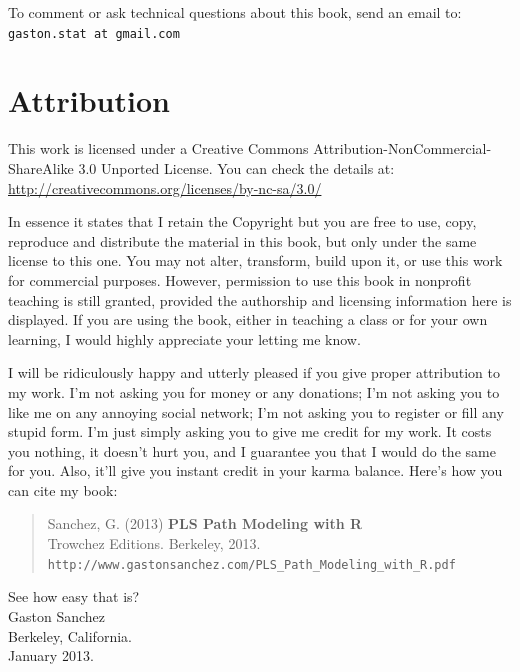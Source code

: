 \documentclass[12pt]{book}\usepackage{graphicx, color}
\begin{document}
To comment or ask technical questions about this book, send an email to: \\
\texttt{gaston.stat at gmail.com}


\section*{Attribution}
This work is licensed under a Creative Commons Attribution-NonCommercial-ShareAlike 3.0 Unported License. You can check the details at: \\
\href{http://creativecommons.org/licenses/by-nc-sa/3.0/}{http://creativecommons.org/licenses/by-nc-sa/3.0/}

In essence it states that I retain the Copyright but you are free to use, copy, reproduce and distribute the material in this book, but only under the same license to this one. You may not alter, transform, build upon it, or use this work for commercial purposes. However, permission to use this book in nonprofit teaching is still granted, provided the authorship and licensing information here is displayed. If you are using the book, either in teaching a class or for your own learning, I would highly appreciate your letting me know.

I will be ridiculously happy and utterly pleased if you give proper attribution to my work. I'm not asking you for money or any donations; I'm not asking you to like me on any annoying social network; I'm not asking you to register or fill any stupid form. I'm just simply asking you to give me credit for my work. It costs you nothing, it doesn't hurt you, and I guarantee you that I would do the same for you. Also, it'll give you instant credit in your karma balance. Here's how you can cite my book:
\vspace{2mm}
\begin{quotation}\noindent
\textsf{Sanchez, G. (2013) \textbf{PLS Path Modeling with R} \\
Trowchez Editions. Berkeley, 2013.} \\
\hspace{1.5mm} \texttt{http://www.gastonsanchez.com/PLS\_Path\_Modeling\_with\_R.pdf}
\end{quotation}
\vspace{2mm}
See how easy that is? \\


\vspace{2mm}
Gaston Sanchez \\
Berkeley, California. \\
January 2013.
\end{document}

